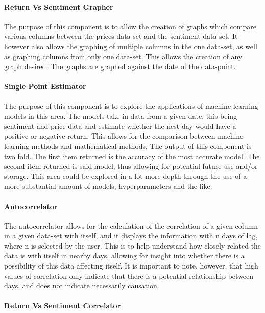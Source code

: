 \paragraph{Return Vs Sentiment Grapher}

The purpose of this component is to allow the creation of graphs which compare various columns between the prices data-set and the sentiment data-set. It however also allows the graphing of multiple columns in the one data-set, as well as graphing columns from only one data-set. This allows the creation of any graph desired. The graphs are graphed against the date of the data-point.

\paragraph{Single Point Estimator}

The purpose of this component is to explore the applications of machine learning models in this area. The models take in data from a given date, this being sentiment and price data and estimate whether the nest day would have a positive or negative return. This allows for the comparison between machine learning methods and mathematical methods. The output of this component is two fold. The first item returned is the accuracy of the most accurate model. The second item returned is said model, thus allowing for potential future use and/or storage. This area could be explored in a lot more depth through the use of a more substantial amount of models, hyperparameters and the like.

\paragraph{Autocorrelator}

The autocorrelator allows for the calculation of the correlation of a given column in a given data-set with itself, and it displays the information with n days of lag, where n is selected by the user. This is to help understand how closely related the data is with itself in nearby days, allowing for insight into whether there is a possibility of this data affecting itself. It is important to note, however, that high values of correlation only indicate that there is a potential relationship between days, and does not indicate necessarily causation.

\paragraph{Return Vs Sentiment Correlator}

